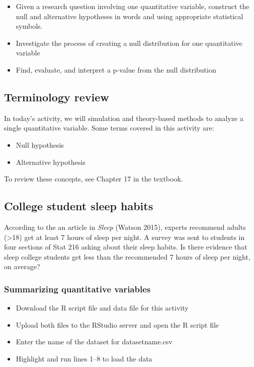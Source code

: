 \documentclass[
]{report}
\begin{document}
\begin{itemize}
\item
  Given a research question involving one quantitative variable, construct the null and alternative hypotheses
  in words and using appropriate statistical symbols.
\item
  Investigate the process of creating a null distribution for one quantitative variable
\item
  Find, evaluate, and interpret a p-value from the null distribution
\end{itemize}

\subsection{Terminology review}\label{terminology-review-10}

In today's activity, we will simulation and theory-based methods to analyze a single quantitative variable. Some terms covered in this activity are:

\begin{itemize}
\item
  Null hypothesis
\item
  Alternative hypothesis
\end{itemize}

To review these concepts, see Chapter 17 in the textbook.

\subsection{College student sleep habits}\label{college-student-sleep-habits}

According to the an article in \emph{Sleep} (Watson 2015), experts recommend adults (\textgreater18) get at least 7 hours of sleep per night. A survey was sent to students in four sections of Stat 216 asking about their sleep habits. Is there evidence that sleep college students get less than the recommended 7 hours of sleep per night, on average?

\subsubsection*{Summarizing quantitative variables}\label{summarizing-quantitative-variables-1}

\begin{itemize}
\item
  Download the R script file and data file for this activity
\item
  Upload both files to the RStudio server and open the R script file
\item
  Enter the name of the dataset for datasetname.csv
\item
  Highlight and run lines 1--8 to load the data
\end{itemize}
\end{document}
